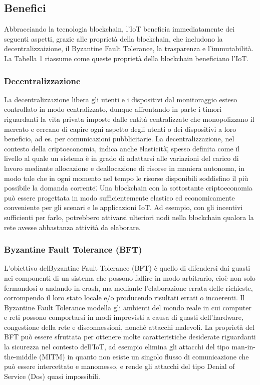 \documentclass[a4paper,12pt]{article}
\begin{document}
\subsection{Benefici}
Abbracciando la tecnologia blockchain, l'IoT beneficia immediatamente dei seguenti aspetti, grazie alle proprietà della blockchain, che includono la decentralizzaizione, il Byzantine Fault Tolerance, la trasparenza e l'immutabilità. La Tabella 1 riassume come queste proprietà della blockchain beneficiano l'IoT.


\subsubsection{Decentralizzazione}
La decentralizzazione libera gli utenti e i dispositivi dal monitoraggio esteso controllato in modo centralizzato, dunque affrontando in parte i timori riguardanti la vita privata imposte dalle entità centralizzate che monopolizzano il mercato e cercano di capire ogni aspetto degli utenti o dei dispositivi a loro beneficio, ad es. per comunicazioni pubblicitarie. La decentralizzazione, nel contesto della criptoeconomia, indica anche \"elasticità\", spesso definita come \"il livello al quale un sistema è in grado di adattarsi alle variazioni del carico di lavoro mediante allocazione e deallocazione di risorse in maniera autonoma, in modo tale che in ogni momento nel tempo le risorse disponibili soddisfino il più possibile la domanda corrente\". Una blockchain con la sottostante criptoeconomia può essere progettata in modo sufficientemente elastico ed economicamente conveniente per gli scenari e le applicazioni IoT. Ad esempio, con gli  incentivi sufficienti per farlo, potrebbero attivarsi ulteriori nodi nella blockchain qualora la rete avesse abbastanza attività da elaborare.

\subsubsection{Byzantine Fault Tolerance (BFT)}
L'obiettivo delByzantine Fault Tolerance (BFT) è quello di difendersi dai guasti nei componenti
di un sistema che possono fallire in modo arbitrario, cioè non solo fermandosi o andando in crash, ma mediante l'elaborazione errata delle richieste, corrompendo il loro stato locale e/o producendo risultati errati o incoerenti. Il Byzantine Fault Tolerance modella gli ambienti del mondo reale in cui computer e reti possono comportarsi in modi imprevisti a causa di guasti dell'hardware, congestione della rete e disconnessioni, nonché attacchi malevoli. La proprietà del BFT può essere sfruttata per ottenere molte caratteristiche desiderate riguardanti la sicurezza nel contesto dell'IoT, ad esempio elimina gli attacchi del tipo man-in-the-middle (MITM) in quanto non esiste un singolo flusso di comunicazione che può essere intercettato e manomesso, e rende gli attacchi del tipo Denial of Service (Dos) quasi impossibili.
\end{document}

